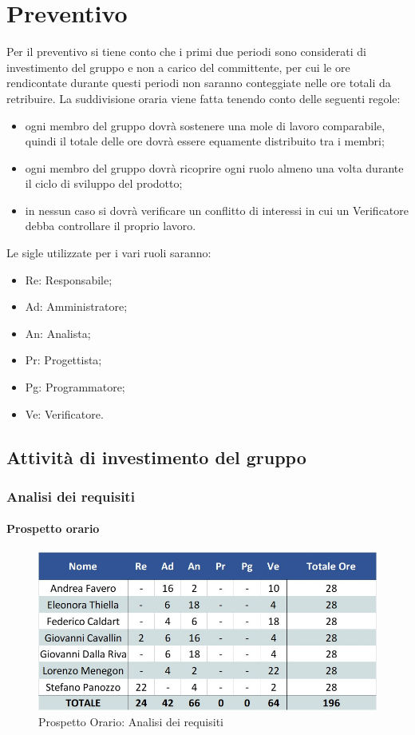 \newpage
\section{Preventivo}

Per il preventivo si tiene conto che i primi due periodi sono considerati di investimento del gruppo e non a carico del committente, per cui le ore rendicontate durante questi periodi non saranno conteggiate nelle ore totali da retribuire.
La suddivisione oraria viene fatta tenendo conto delle seguenti regole:
\begin{itemize}
	\item ogni membro del gruppo dovrà sostenere una mole di lavoro comparabile, quindi il totale delle ore dovrà essere equamente distribuito tra i membri;
	\item ogni membro del gruppo dovrà ricoprire ogni ruolo almeno una volta durante il ciclo di sviluppo del prodotto;
	\item in nessun caso si dovrà verificare un conflitto di interessi in cui un Verificatore debba	controllare il proprio lavoro.
\end{itemize}
Le sigle utilizzate per i vari ruoli saranno:
\begin{itemize}
	\item Re: Responsabile;
	\item Ad: Amministratore;
	\item An: Analista;
	\item Pr: Progettista;
	\item Pg: Programmatore;
	\item Ve: Verificatore.
\end{itemize}

\subsection{Attività di investimento del gruppo}
\subsubsection{Analisi dei requisiti}
\paragraph{Prospetto orario}
\begin{figure}[h!]
	\centerline{\includegraphics[scale=0.4]{img/Preventivo/AnalisiRequisiti.Orario.jpg}}
	\caption{Prospetto Orario: Analisi dei requisiti}
\end{figure}
